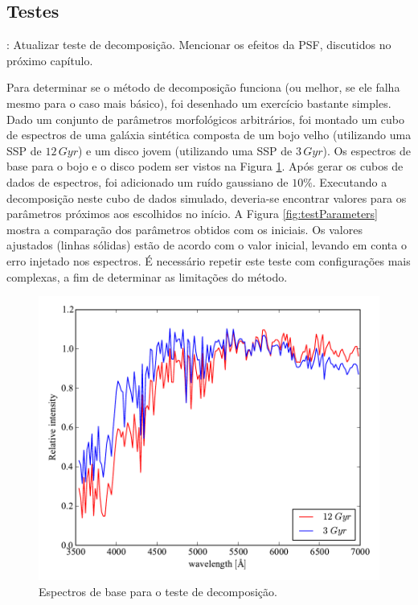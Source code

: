 \subsection{Testes}

\TODO: Atualizar teste de decomposição. Mencionar os efeitos da PSF, discutidos
no próximo capítulo.

Para determinar se o método de decomposição funciona (ou melhor, se ele falha
mesmo para o caso mais básico), foi desenhado um exercício bastante simples.
Dado um conjunto de parâmetros morfológicos arbitrários, foi montado um cubo de
espectros de uma galáxia sintética composta de um bojo velho (utilizando uma SSP
de $12\,Gyr$) e um disco jovem (utilizando uma SSP de $3\,Gyr$). Os espectros de
base para o bojo e o disco podem ser vistos na Figura \ref{fig:testSpectra}.
Após gerar os cubos de dados de espectros, foi adicionado um ruído gaussiano de
$10\%$. Executando a decomposição neste cubo de dados simulado, deveria-se
encontrar valores para os parâmetros próximos aos escolhidos no início. A Figura
\ref{fig:testParameters} mostra a comparação dos parâmetros obtidos com os
iniciais. Os valores ajustados (linhas sólidas) estão de acordo com o valor
inicial, levando em conta o erro injetado nos espectros. É necessário repetir
este teste com configurações mais complexas, a fim de determinar as limitações
do método.


\begin{figure}
	\includegraphics[width=0.7\columnwidth]{figuras/test-spectra}
	\caption[Espectros de base para o teste de decomposição] {Espectros de base
	para o teste de decomposição.}
	\label{fig:testSpectra}
\end{figure}


